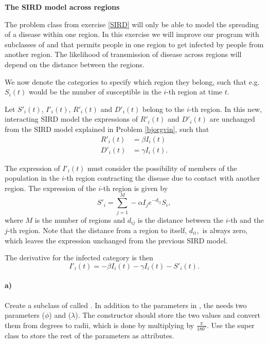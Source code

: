 \begin{Problem}{\textbf{The SIRD model across regions}} \label{SIRD_interaction}

\noindent
The problem class from exercise \ref{SIRD} will only be able to model the spreading of a disease within one region. In this exercise we will improve our program with subclasses of  and  that permits  people in one region to get infected by people from another region. The likelihood of transmission of disease across regions  will depend on the distance between the regions.

We now denote the categories to specify which region they belong, such that e.g.  $S_i (t)$ would be the number of susceptible in the $i$-th region at time $t$.

Let $S'_i(t)$, $I'_i (t)$, $R'_i(t)$ and $D'_i(t)$ belong to the $i$-th region. In this new, interacting SIRD model the expressions of $R'_i(t)$ and $D'_i(t)$ are unchanged from the SIRD model explained in Problem \ref{bjorgvin}, such that
\begin{align*}
    R'_i (t) &= \beta I_i (t) \\
    D'_i (t) &= \gamma I_i (t) .
\end{align*}

The expression of  $I'_i (t)$ must consider the possibility of members of the population in the $i$-th region contracting the disease due to contact with another region. The expression of the $i$-th region is given by
\begin{equation*}
    S'_i = \sum_{j=1}^{M}-\alpha I_j e^{-d_{ij}}  S_i  ,
\end{equation*}
where $M$ is the number of regions and  $d_{ij}$ is the distance between the $i$-th and the $j$-th region. Note that the distance from a region to itself, $d_{ii},$ is always zero, which leaves the expression unchanged from the previous SIRD model.

The derivative for the infected category is then
\begin{equation*}
   I'_i (t) = -\beta I_i(t) - \gamma I_i (t) - S'_i (t) .
\end{equation*}

\paragraph{a)}
Create a subclass of  called . In addition to the parameters in , the  needs two parameters  ($\phi$)  and  ($\lambda$). The constructor should store the two values and convert them from degrees to radii, which is done by multiplying by $\frac{\pi}{180^{\circ}}$. Use the super class to store the rest of the parameters as attributes.


\end{Problem}
